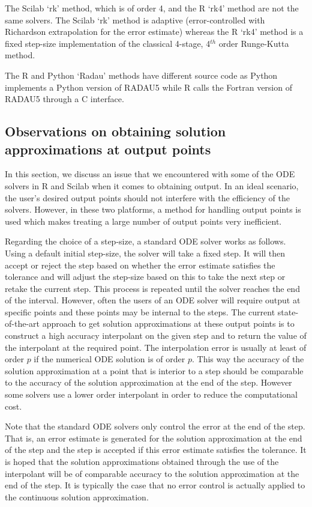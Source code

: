 The Scilab `rk' method, which is of order 4, and the R `rk4' method are not the same solvers. The Scilab `rk' method is adaptive (error-controlled with Richardson extrapolation for the error estimate) whereas the R `rk4' method is a fixed step-size implementation of the classical 4-stage, 4$^{th}$ order Runge-Kutta method.

The R and Python `Radau' methods have different source code as Python implements a Python version of RADAU5 while R calls the Fortran version of RADAU5 through a C interface.

\subsection{Observations on obtaining solution approximations at output points}
\label{subsection:solution_output_points_impl}
In this section, we discuss an issue that we encountered with some of the ODE solvers in R and Scilab when it comes to obtaining output. In an ideal scenario, the user's desired output points should not interfere with the efficiency of the solvers. However, in these two platforms, a method for handling output points is used which makes treating a large number of output points very inefficient.

Regarding the choice of a step-size, a standard ODE solver works as follows. Using a default initial step-size, the solver will take a fixed step. It will then accept or reject the step based on whether the error estimate satisfies the tolerance and will adjust the step-size based on this to take the next step or retake the current step. This process is repeated until the solver reaches the end of the interval. However, often the users of an ODE solver will require output at specific points and these points may be internal to the steps. The current state-of-the-art approach to get solution approximations at these output points is to construct a high accuracy interpolant on the given step and to return the value of the interpolant at the required point. The interpolation error is usually at least of order $p$ if the numerical ODE solution is of order $p$. This way the accuracy of the solution approximation at a point that is interior to a step should be comparable to the accuracy of the solution approximation at the end of the step. However some solvers use a lower order interpolant in order to reduce the computational cost.

Note that the standard ODE solvers only control the error at the end of the step. That is, an error estimate is generated for the solution approximation at the end of the step and the step is accepted if this error estimate satisfies the tolerance. It is hoped that the solution approximations obtained through the use of the interpolant will be of comparable accuracy to the solution approximation at the end of the step. It is typically the case that no error control is actually applied to the continuous solution approximation.

